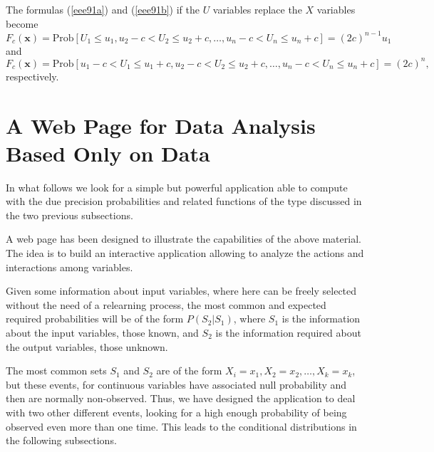 \documentclass[
	11pt, %
	fleqn, %
	a4paper, %
]{LegrandOrangeBook}
\begin{document}
\begin{corollary}
The formulas (\ref{eee91a}) and (\ref{eee91b}) if the $U$ variables replace the $X$ variables become
\begin{equation}
F_c(\mathbf{x}) = \mathrm{Prob}\left[ U_1 \leq u_1,  u_2 - c < U_2 \leq u_2 + c,  \dots,  u_n - c < U_n \leq u_n + c \right] = (2c)^{n-1} u_1
\end{equation}
and
\begin{equation}
F_c(\mathbf{x}) = \mathrm{Prob}\left[ u_1 - c < U_1 \leq u_1 + c,  u_2 - c < U_2 \leq u_2 + c,  \dots,  u_n - c < U_n \leq u_n + c \right] =  (2c)^n,
\end{equation}
respectively.

\end{corollary}


\section{A Web Page for Data Analysis Based Only on Data}
In what follows we look for a simple but powerful application able to compute with the due precision probabilities and related functions of the type discussed in the two previous subsections.

A web page has been designed to illustrate the capabilities of the above material. The idea is to build an interactive application allowing to analyze the actions and interactions among variables.

Given some information about input variables, where here can be freely selected without the need of a relearning process, the most common and expected required probabilities will be of the form $P(S_2|S_1)$, where $S_1$ is the information about the input variables, those known, and $S_2$ is the information required about the output variables, those unknown.

The most common sets $S_1$ and $S_2$ are of the form $X_i = x_1, X_2 = x_2,\ldots, X_k = x_k$, but these events, for continuous variables have associated null probability and then are normally non-observed. Thus, we have designed the application to deal with two other different events, looking for a high enough probability of being observed even more than one time. This leads to the conditional distributions in the following subsections.
\end{document}
